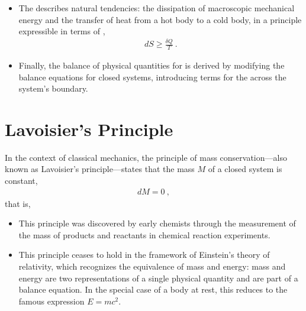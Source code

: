 \documentclass[letterpaper,10pt,english]{jupyterBook}
\begin{document}
\begin{itemize}
\item {} 
\sphinxAtStartPar
The {\hyperref[\detokenize{ch/principles-second:physics-hs-thermodynamics-foundation-principles-second}]{}} describes natural tendencies: the dissipation of macroscopic mechanical energy and the transfer of heat from a hot body to a cold body, in a principle expressible in terms of ,
\begin{equation*}
\begin{split}d S \ge \frac{\delta Q}{T} \ .\end{split}
\end{equation*}
\item {} 
\sphinxAtStartPar
Finally, the balance of physical quantities for {\hyperref[\detokenize{ch/principles-open:physics-hs-thermodynamics-foundation-principles-open}]{}} is derived by modifying the balance equations for closed systems, introducing terms for the  across the system’s boundary.

\end{itemize}



\sphinxstepscope


\section{Lavoisier’s Principle}
\label{\detokenize{ch/principles-lavoisier:lavoisier-s-principle}}\label{\detokenize{ch/principles-lavoisier:physics-hs-thermodynamics-foundation-principles-lavoisier}}\label{\detokenize{ch/principles-lavoisier::doc}}
\sphinxAtStartPar
In the context of classical mechanics, the principle of mass conservation—also known as Lavoisier’s principle—states that the mass \(M\) of a closed system is constant,
\begin{equation*}
\begin{split}d M = 0 \ ,\end{split}
\end{equation*}
\sphinxAtStartPar
that is, 
\begin{itemize}
\item {} 
\sphinxAtStartPar
This principle was discovered by early chemists through the measurement of the mass of products and reactants in chemical reaction experiments.

\item {} 
\sphinxAtStartPar
This principle ceases to hold in the framework of Einstein’s theory of relativity, which recognizes the equivalence of mass and energy: mass and energy are two representations of a single physical quantity and are part of a balance equation. In the special case of a body at rest, this reduces to the famous expression \(E = m c^2\).

\end{itemize}
\end{document}

